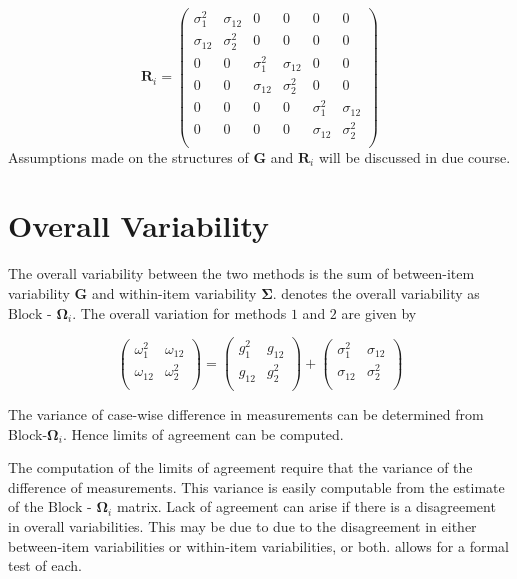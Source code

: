 \documentclass[12pt, a4paper]{report}
\theoremstyle{plain}
\theoremstyle{definition}
\theoremstyle{remark}
\begin{document}
\[
\boldsymbol{R}_i = \left(
\begin{array}{cccccc}
\sigma^2_{1} & \sigma_{12} & 0 & 0 & 0 & 0 \\
\sigma_{12} & \sigma^2_{2} & 0 & 0 & 0 & 0 \\
0 & 0 & \sigma^2_{1} & \sigma_{12} & 0 & 0 \\
0 & 0 & \sigma_{12} & \sigma^2_{2} & 0 & 0 \\
0 & 0 & 0 & 0 & \sigma^2_{1} & \sigma_{12} \\
0 & 0 & 0 & 0 & \sigma_{12} & \sigma^2_{2} \\
\end{array} \right)
\]
Assumptions made on the structures of $\boldsymbol{G}$ and $\boldsymbol{R}_i$ will be discussed in due course.


\section{Overall Variability}
The overall variability between the two methods is the sum of between-item variability
$\boldsymbol{G}$ and within-item variability $\boldsymbol{\Sigma}$. \citet{ARoy2009} denotes the overall variability	as ${\mbox{Block - }\boldsymbol \Omega_{i}}$. The overall variation for methods $1$ and $2$ are given by

\begin{center}
	\[\left(\begin{array}{cc}
	\omega^2_1  & \omega_{12} \\
	\omega_{12} & \omega^2_2 \\
	\end{array}  \right)
	=  \left(
	\begin{array}{cc}
	g^2_1  & g_{12} \\
	g_{12} & g^2_2 \\
	\end{array} \right)+
	\left(
	\begin{array}{cc}
	\sigma^2_1  & \sigma_{12} \\
	\sigma_{12} & \sigma^2_2 \\
	\end{array}\right)
	\]
\end{center}

The variance of case-wise difference in measurements can be determined from Block-$\boldsymbol{\Omega}_{i}$. Hence limits of agreement can be computed.


The computation of the limits of agreement require that the variance of the difference of measurements. This variance is easily computable from the estimate of the ${\mbox{Block - }\boldsymbol \Omega_{i}}$ matrix. Lack of agreement can arise if there is a disagreement in overall variabilities. This may be due to due to the disagreement in either between-item
variabilities or within-item variabilities, or both. \citet{ARoy2009} allows for a formal test of each.
\end{document}
